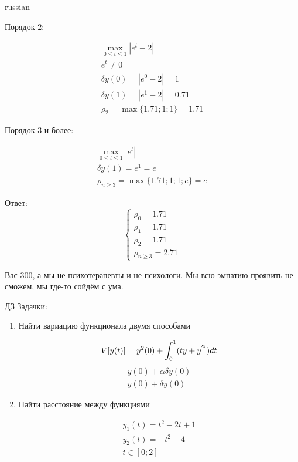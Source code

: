 \documentclass{article}
\begin{document}
\begin{otherlanguage*}{russian}
\begin{enumerate}
Порядок 2: 

\begin{align}
\max_{0 \le t \le 1} | e ^ t - 2 | \\
e^t \ne 0  \\
\delta y(0) = |e^0 - 2| = 1 \\ 
\delta y(1) = |e^1 - 2| = 0.71 \\
\rho_2 = \max \{ 1.71; 1; 1 \} = 1.71
\end{align}

Порядок 3 и более: 

\begin{align}
\max_{0 \le t \le 1} | e ^ t | \\
\delta y(1) = e^ 1 = e \\
\rho_{n \ge 3}  = \max \{ 1.71; 1; 1; e \} = e
\end{align}

Ответ: 
\begin{equation}
\begin{cases}
\rho_0 = 1.71 \\
\rho_1 = 1.71 \\
\rho_2 = 1.71 \\
\rho_{n \ge 3} = 2.71  
\end{cases}
\end{equation}

Вас 300, а мы не психотерапевты и не психологи. Мы всю эмпатию проявить не сможем, мы где-то сойдём с ума. 

ДЗ Задачки: 
\begin{enumerate}

\item Найти вариацию функционала двумя способами 

\begin{equation}
V [ y(t) ] = y^ 2 (0) + \int_0^1 (ty + y^{'^2} ) dt  \\
\end{equation}
\begin{align}
y(0) + \alpha \delta y (0) \\
y(0) + \delta y (0) 
\end{align}

\item Найти расстояние между функциями 

\begin{align}
y_1 (t) = t ^ 2 - 2 t + 1 \\
y_2(t) = -t ^ 2 + 4 \\
t \in [0;2] 
\end{align}
\end{enumerate}
\end{enumerate}

\end{otherlanguage*}
\end{document}
